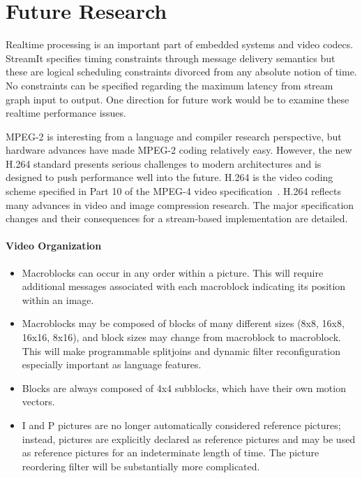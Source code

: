 \section{Future Research}
\label{section:future}

Realtime processing is an important part of embedded systems and video
codecs. StreamIt specifies timing constraints through message delivery
semantics but these are logical scheduling constraints divorced from
any absolute notion of time. No constraints can be specified 
regarding the maximum latency from stream graph input to 
output. One direction for future work would be to
examine these realtime performance issues.

MPEG-2 is interesting from a language 
and compiler research perspective, but hardware advances have made MPEG-2 
coding relatively easy. 
However, the new H.264 standard presents serious challenges to 
modern architectures and is designed to push performance well into the 
future. 
H.264 is the video coding scheme specified in Part 10 of the MPEG-4 
video specification~\cite{MPEG4}. H.264 reflects many advances in video and image compression 
research. The major specification changes and their consequences for 
a stream-based implementation are detailed.

\paragraph{Video Organization}
\begin{itemize}
\item Macroblocks can occur in any order within a picture. 
This will require additional messages associated with each 
macroblock indicating its position within an image.
\item Macroblocks may be composed of blocks of many different 
sizes (8x8, 16x8, 16x16, 8x16), and block sizes may change 
from macroblock to macroblock. This will make programmable 
splitjoins and dynamic filter reconfiguration especially 
important as language features.
\item Blocks are always composed of 4x4 subblocks, which 
have their own motion vectors.
\item I and P pictures are no longer automatically considered 
reference pictures; instead, pictures are explicitly declared 
as reference pictures and may be used as reference pictures 
for an indeterminate length of time. The picture reordering 
filter will be substantially more complicated. 
\end{itemize}

